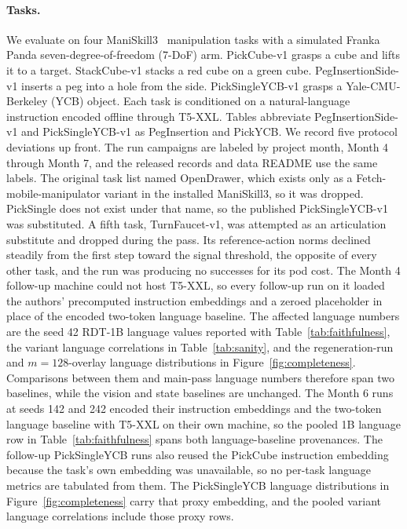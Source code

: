 \documentclass{article}
\begin{document}
\paragraph{Tasks.}
We evaluate on four ManiSkill3~\cite{tao2024maniskill3} manipulation tasks with a simulated Franka Panda seven-degree-of-freedom (7-DoF) arm.
PickCube-v1 grasps a cube and lifts it to a target.
StackCube-v1 stacks a red cube on a green cube.
PegInsertionSide-v1 inserts a peg into a hole from the side.
PickSingleYCB-v1 grasps a Yale-CMU-Berkeley (YCB) object.
Each task is conditioned on a natural-language instruction encoded offline through T5-XXL.
Tables abbreviate PegInsertionSide-v1 and PickSingleYCB-v1 as PegInsertion and PickYCB.
We record five protocol deviations up front.
The run campaigns are labeled by project month, Month 4 through Month 7, and the released records and data README use the same labels.
The original task list named OpenDrawer, which exists only as a Fetch-mobile-manipulator variant in the installed ManiSkill3, so it was dropped.
PickSingle does not exist under that name, so the published PickSingleYCB-v1 was substituted.
A fifth task, TurnFaucet-v1, was attempted as an articulation substitute and dropped during the pass.
Its reference-action norms declined steadily from the first step toward the signal threshold, the opposite of every other task, and the run was producing no successes for its pod cost.
The Month 4 follow-up machine could not host T5-XXL, so every follow-up run on it loaded the authors' precomputed instruction embeddings and a zeroed placeholder in place of the encoded two-token language baseline.
The affected language numbers are the seed 42 RDT-1B language values reported with Table~\ref{tab:faithfulness}, the variant language correlations in Table~\ref{tab:sanity}, and the regeneration-run and $m{=}128$-overlay language distributions in Figure~\ref{fig:completeness}.
Comparisons between them and main-pass language numbers therefore span two baselines, while the vision and state baselines are unchanged.
The Month 6 runs at seeds 142 and 242 encoded their instruction embeddings and the two-token language baseline with T5-XXL on their own machine, so the pooled 1B language row in Table~\ref{tab:faithfulness} spans both language-baseline provenances.
The follow-up PickSingleYCB runs also reused the PickCube instruction embedding because the task's own embedding was unavailable, so no per-task language metrics are tabulated from them.
The PickSingleYCB language distributions in Figure~\ref{fig:completeness} carry that proxy embedding, and the pooled variant language correlations include those proxy rows.
\end{document}
